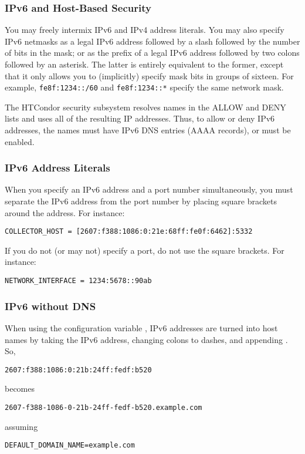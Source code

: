 \subsubsection{IPv6 and Host-Based Security}

You may freely intermix IPv6 and IPv4 address literals.  You may also specify
IPv6 netmasks as a legal IPv6 address followed by a slash followed by the
number of bits in the mask; or as the prefix of a legal IPv6 address followed
by two colons followed by an asterisk.  The latter is entirely equivalent to the
former, except that it only allows you to (implicitly) specify mask bits
in groups of sixteen.  For example, \texttt{fe8f:1234::/60} and
\texttt{fe8f:1234::*} specify the same network mask.

The HTCondor security subsystem resolves names in the ALLOW and DENY
lists and uses all of the resulting IP addresses.  Thus, to allow or deny
IPv6 addresses, the names must have IPv6 DNS entries (AAAA records), or
 must be enabled.

\subsubsection{IPv6 Address Literals}

When you specify an IPv6 address and a port number simultaneously, you
must separate the IPv6 address from the port number by placing square
brackets around the address.  For instance:

\begin{verbatim}
COLLECTOR_HOST = [2607:f388:1086:0:21e:68ff:fe0f:6462]:5332
\end{verbatim}

If you do not (or may not) specify a port, do not use the square brackets.
For instance:

\begin{verbatim}
NETWORK_INTERFACE = 1234:5678::90ab
\end{verbatim}

\subsubsection{IPv6 without DNS}

When using the configuration variable ,
IPv6 addresses are turned into host names by taking the IPv6 address,
changing colons to dashes, and appending .
So,
\begin{verbatim}
2607:f388:1086:0:21b:24ff:fedf:b520
\end{verbatim}
becomes
\begin{verbatim}
2607-f388-1086-0-21b-24ff-fedf-b520.example.com
\end{verbatim}
assuming
\begin{verbatim}
DEFAULT_DOMAIN_NAME=example.com
\end{verbatim}

